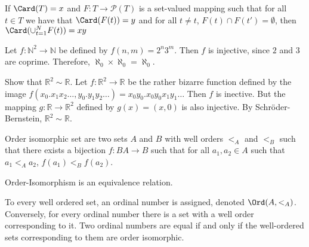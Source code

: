 \documentclass[crop=false,class=book,oneside]{standalone}
\begin{document}
            \begin{theorem*}
                If $\Card(T)=x$ and
                $F:{T}\rightarrow{\mathcal{P}(T)}$
                is a set-valued mapping such that for all
                ${t}\in{T}$ we have that
                $\Card(F(t))=y$ and
                for all ${t}\ne{t}$,
                ${F(t)}\cap{F(t')}=\emptyset$, then
                $\Card(\cup_{t=1}^{N}F(t))=xy$
            \end{theorem*}
            \begin{example}
                Let $f:{\mathbb{N}^{2}}\rightarrow{\mathbb{N}}$
                be defined by $f(n,m)=2^{n}3^{m}$.
                Then $f$ is injective, since $2$ and $3$
                are coprime. Therefore,
                $\aleph_{0}\times\aleph_{0}=\aleph_{0}$.
            \end{example}
            \begin{example}
                Show that $\mathbb{R}^{2}\sim\mathbb{R}$.
                Let $f:\mathbb{R}^{2}\rightarrow\mathbb{R}$
                be the rather bizarre function defined by the image
                $f(x_{0}.x_{1}x_{2}\hdots,y_{0}.y_{1}y_{2}\hdots)%
                 =x_{0}y_{0}.x_{0}y_{0}x_{1}y_{1}\hdots$ Then
                $f$ is inective. But the mapping
                $g:\mathbb{R}\rightarrow\mathbb{R}^{2}$
                defined by $g(x)=(x,0)$ is also injective.
                By Schr\"{o}der-Bernstein,
                $\mathbb{R}^{2}\sim\mathbb{R}$.
            \end{example}
             \begin{definition}
                Order isomorphic set are two sets $A$ and $B$
                with well orders $<_{A}$ and $<_{B}$ such that
                there exists a bijection $f:{B}A\rightarrow{B}$
                such that for all $a_{1},a_{2}\in{A}$ such that
                $a_{1}<_{A}a_{2}$, $f(a_{1})<_{B}f(a_{2})$.
             \end{definition}
             \begin{theorem*}
                Order-Isomorphism is an equivalence relation.
             \end{theorem*}
             To every well ordered set, an ordinal number is
             assigned, denoted $\Ord(A,<_{A})$. Conversely,
             for every ordinal number there is a set with a
             well order corresponding to it. Two ordinal numbers
             are equal if and only if the well-ordered sets
             corresponding to them are order isomorphic.
\end{document}
